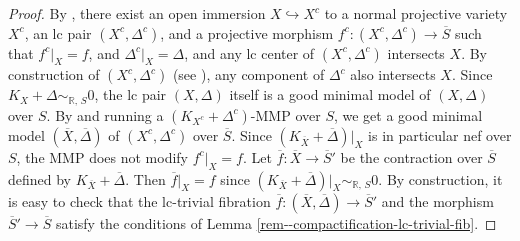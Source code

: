 \documentclass[12pt,twoside]{amsart}
\theoremstyle{definition}
\begin{document}
\begin{proof}
By \cite[Corollary 1.3]{has-mmp}, there exist an open immersion $X \hookrightarrow X^{c}$ to a normal projective variety $X^{c}$, an lc pair $(X^{c},\Delta^{c})$, and a projective morphism $f^{c} \colon (X^{c},\Delta^{c}) \to \overline{S}$ such that $f^{c}|_{X}=f$, and $\Delta^{c}|_{X}=\Delta$, and any lc center of $(X^{c},\Delta^{c})$ intersects $X$. 
By construction of $(X^{c},\Delta^{c})$ (see \cite[Proof of Corollary 1.3]{has-mmp}),  any component of $\Delta^{c}$ also intersects $X$. 
Since $K_{X}+\Delta \sim_{\mathbb{R},\,S}0$, the lc pair $(X,\Delta)$ itself is a good minimal model of $(X,\Delta)$ over $S$. 
By \cite[Theorem 1.2]{has-mmp} and running a $(K_{X^{c}}+\Delta^{c})$-MMP over $S$, we get a good minimal model $(\overline{X},\overline{\Delta})$ of $(X^{c},\Delta^{c})$ over $\overline{S}$. 
Since $(K_{\overline{X}}+\overline{\Delta})|_{X}$ is in particular nef over $S$, the MMP does not modify $f^{c}|_{X}=f$. 
Let $\overline{f} \colon \overline{X} \to \overline{S}'$ be the contraction over $\overline{S}$ defined by $K_{\overline{X}}+\overline{\Delta}$. 
Then $\overline{f}|_{X}=f$ since $(K_{\overline{X}}+\overline{\Delta})|_{X} \sim_{\mathbb{R},\,S}0$. 
By construction, it is easy to check that the lc-trivial fibration $\overline{f}\colon (\overline{X},\overline{\Delta}) \to \overline{S}'$ and the morphism $\overline{S}' \to \overline{S}$ satisfy the conditions of Lemma \ref{rem--compactification-lc-trivial-fib}. 


\end{proof}
\end{document}
